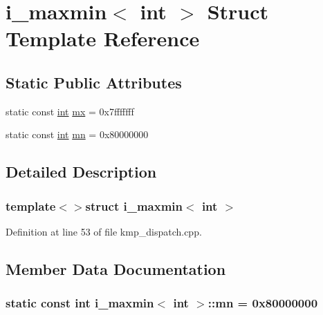 \hypertarget{structi__maxmin_3_01int_01_4}{\section{i\-\_\-maxmin$<$ int $>$ Struct Template Reference}
\label{structi__maxmin_3_01int_01_4}
}
\subsection*{Static Public Attributes}
\begin{DoxyCompactItemize}
\item 
static const \hyperlink{ittnotify__static_8h_a8b8dcd723308a8cb5d84277c7a3fff70}{int} \hyperlink{structi__maxmin_3_01int_01_4_aab31e71385a47754964cfb0d06ed4ba8}{mx} = 0x7fffffff
\item 
static const \hyperlink{ittnotify__static_8h_a8b8dcd723308a8cb5d84277c7a3fff70}{int} \hyperlink{structi__maxmin_3_01int_01_4_a47764c5470f2ae5c49a9189ce5bb9c08}{mn} = 0x80000000
\end{DoxyCompactItemize}


\subsection{Detailed Description}
\subsubsection*{template$<$$>$struct i\-\_\-maxmin$<$ int $>$}



Definition at line 53 of file kmp\-\_\-dispatch.\-cpp.



\subsection{Member Data Documentation}
\hypertarget{structi__maxmin_3_01int_01_4_a47764c5470f2ae5c49a9189ce5bb9c08}{
\subsubsection[{mn}]{\setlength{\rightskip}{0pt plus 5cm}static const {\bf int} {\bf i\-\_\-maxmin}$<$ {\bf int} $>$\-::mn = 0x80000000\hspace{0.3cm}{\ttfamily [static]}}}\label{structi__maxmin_3_01int_01_4_a47764c5470f2ae5c49a9189ce5bb9c08}



